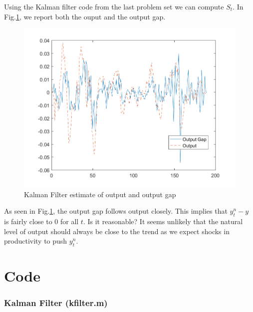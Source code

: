 \documentclass[12pt]{article}
\theoremstyle{definition}
\begin{document}
Using the Kalman filter code from the last problem set we can compute $S_t$. In Fig.\ref{fig:kalman}, we report both the ouput and the output gap.
\begin{figure}[H]
	\centering
	\includegraphics[width=\linewidth]{kalman}
	\caption{Kalman Filter estimate of output and output gap}
	\label{fig:kalman}
\end{figure}

As seen in Fig.\ref{fig:kalman}, the output gap follows output closely. This implies that $y_t^n-y$ is fairly close to 0 for all $t$. Is it reasonable? It seems unlikely that the natural level of output should always be close to the trend as we expect shocks in productivity to push $y_t^n$.

\section*{Code}

\subsubsection*{Kalman Filter (kfilter.m)}

\end{document}
